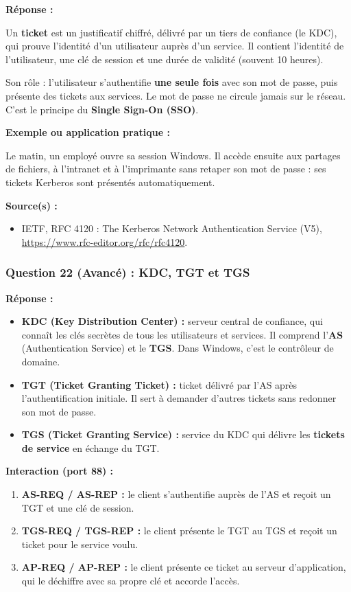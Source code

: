 \documentclass[12pt,a4paper]{article}
\newcommand{\reponse}{\textbf{Réponse :}\par}
\newcommand{\exemple}{\textbf{Exemple ou application pratique :}\par}
\newcommand{\sources}{\textbf{Source(s) :}}
\begin{document}
\reponse
Un \textbf{ticket} est un justificatif chiffré, délivré par un tiers de
confiance (le KDC), qui prouve l'identité d'un utilisateur auprès d'un
service. Il contient l'identité de l'utilisateur, une clé de session et
une durée de validité (souvent 10 heures).

Son rôle : l'utilisateur s'authentifie \textbf{une seule fois} avec son
mot de passe, puis présente des tickets aux services. Le mot de passe
ne circule jamais sur le réseau. C'est le principe du \textbf{Single
Sign-On (SSO)}.

\exemple
Le matin, un employé ouvre sa session Windows. Il accède ensuite aux
partages de fichiers, à l'intranet et à l'imprimante sans retaper son
mot de passe : ses tickets Kerberos sont présentés automatiquement.

\sources
\begin{itemize}
    \item IETF, RFC 4120 : The Kerberos Network Authentication Service
    (V5), \url{https://www.rfc-editor.org/rfc/rfc4120}.
\end{itemize}

\subsubsection*{Question 22 (Avancé) : KDC, TGT et TGS}

\reponse
\begin{itemize}
    \item \textbf{KDC (Key Distribution Center) :} serveur central de
    confiance, qui connaît les clés secrètes de tous les utilisateurs et
    services. Il comprend l'\textbf{AS} (Authentication Service) et le
    \textbf{TGS}. Dans Windows, c'est le contrôleur de domaine.
    \item \textbf{TGT (Ticket Granting Ticket) :} ticket délivré par
    l'AS après l'authentification initiale. Il sert à demander d'autres
    tickets sans redonner son mot de passe.
    \item \textbf{TGS (Ticket Granting Service) :} service du KDC qui
    délivre les \textbf{tickets de service} en échange du TGT.
\end{itemize}

\textbf{Interaction (port 88) :}
\begin{enumerate}
    \item \textbf{AS-REQ / AS-REP :} le client s'authentifie auprès de
    l'AS et reçoit un TGT et une clé de session.
    \item \textbf{TGS-REQ / TGS-REP :} le client présente le TGT au TGS
    et reçoit un ticket pour le service voulu.
    \item \textbf{AP-REQ / AP-REP :} le client présente ce ticket au
    serveur d'application, qui le déchiffre avec sa propre clé et
    accorde l'accès.
\end{enumerate}
\end{document}
